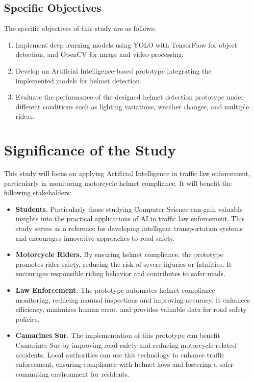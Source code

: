 \begin{refsection}
\subsection{Specific Objectives}

The specific objectives of this study are as follows:

\begin{enumerate}
    \item Implement deep learning models using YOLO with TensorFlow for object detection, and OpenCV for image and video processing.
    \item Develop an Artificial Intelligence-based prototype integrating the implemented models for helmet detection. 
    \item Evaluate the performance of the designed helmet detection prototype under different conditions such as lighting variations, weather changes, and multiple riders.  
\end{enumerate}
   

\section{Significance of the Study}

This study will focus on applying Artificial Intelligence in traffic law enforcement, particularly in monitoring motorcycle helmet compliance. It will benefit the following stakeholders:

\begin{itemize}
    \item \textbf{Students.} Particularly those studying Computer Science can gain valuable insights into the practical applications of AI in traffic law enforcement. This study serves as a reference for developing intelligent transportation systems and encourages innovative approaches to road safety.
    
    \item \textbf{Motorcycle Riders.} By ensuring helmet compliance, the prototype promotes rider safety, reducing the risk of severe injuries or fatalities. It encourages responsible riding behavior and contributes to safer roads.
    
    \item \textbf{Law Enforcement.} The prototype automates helmet compliance monitoring, reducing manual inspections and improving accuracy. It enhances efficiency, minimizes human error, and provides valuable data for road safety policies.
    
    \item \textbf{Camarines Sur.} The implementation of this prototype can benefit Camarines Sur by improving road safety and reducing motorcycle-related accidents. Local authorities can use this technology to enhance traffic enforcement, ensuring compliance with helmet laws and fostering a safer commuting environment for residents.
    

\end{itemize}
\end{refsection}
